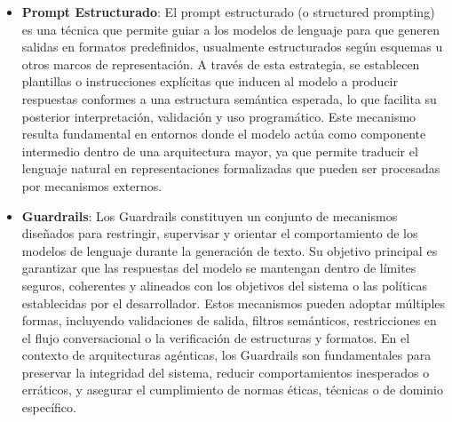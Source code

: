 \begin{itemize}
\item \textbf{Prompt Estructurado}: El prompt estructurado (o structured prompting)
    es una técnica que permite guiar a los modelos de lenguaje para que generen
    salidas en formatos predefinidos, usualmente estructurados según esquemas u 
    otros marcos de representación. A través de esta estrategia, se establecen 
    plantillas o instrucciones explícitas que inducen al modelo a producir
    respuestas conformes a una estructura semántica esperada, lo que facilita su
    posterior interpretación, validación y uso programático. Este mecanismo
    resulta fundamental en entornos donde el modelo actúa como componente
    intermedio dentro de una arquitectura mayor, ya que permite traducir el
    lenguaje natural en representaciones formalizadas que pueden ser procesadas
    por mecanismos externos. 

\item \textbf{Guardrails}: Los Guardrails constituyen un conjunto de mecanismos
    diseñados para restringir, supervisar y orientar el comportamiento de los
    modelos de lenguaje durante la generación de texto. Su objetivo principal es
    garantizar que las respuestas del modelo se mantengan dentro de límites seguros,
    coherentes y alineados con los objetivos del sistema o las políticas
    establecidas por el desarrollador. Estos mecanismos pueden adoptar múltiples
    formas, incluyendo validaciones de salida, filtros semánticos, restricciones en
    el flujo conversacional o la verificación de estructuras y formatos. En el
    contexto de arquitecturas agénticas, los Guardrails son fundamentales para
    preservar la integridad del sistema, reducir comportamientos inesperados o
    erráticos, y asegurar el cumplimiento de normas éticas, técnicas o de dominio
    específico.

\end{itemize}